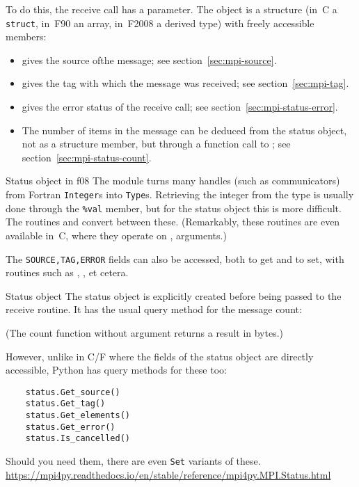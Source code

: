 To do this, the receive call has a  parameter.
The  object
is a structure (in~C a \lstinline{struct}, in~F90 an array, in~F2008 a derived type)
with freely accessible members:
\begin{itemize}
\item {} gives the source ofthe message;
  see section~\ref{sec:mpi-source}.
\item {} gives the tag with which the message was received;
  see section~\ref{sec:mpi-tag}.
\item {} gives the error status of the receive call;
  see section~\ref{sec:mpi-status-error}.
\item The number of items in the message can be deduced from the status object,
  not as a structure member,
  but through a function call to ;  
  see section~\ref{sec:mpi-status-count}.
\end{itemize}

\begin{fortrannote}{Status object in f08}
  \label{f:status-object}
  The  module turns many handles
  (such as communicators)
  from Fortran \lstinline{Integer}s into \lstinline{Type}s.
  Retrieving the integer from the type is usually done
  through the \lstinline+%val+ member,
  but for the status object this is more difficult.
  The routines  and 
  convert between these.
  (Remarkably, these routines are even available in~C,
  where they operate on ,  arguments.)
\end{fortrannote}

\begin{mpifournote}
  The \lstinline{SOURCE,TAG,ERROR} fields can also be accessed,
  both to get and to set,
  with routines such as
  ,
  ,
  et cetera.
\end{mpifournote}

\begin{pythonnote}{Status object}
  The status object is explicitly created before being passed
  to the receive routine. It has the usual query method
  for the message count:

  (The count function without argument returns a result in bytes.)

  However, unlike in C/F where the fields of the status object
  are directly accessible, Python has query methods for these too:
  \begin{lstlisting}
    status.Get_source()
    status.Get_tag()
    status.Get_elements()
    status.Get_error()
    status.Is_cancelled()
  \end{lstlisting}
  Should you need them, there are even \lstinline{Set}
  variants of these.
  \url{https://mpi4py.readthedocs.io/en/stable/reference/mpi4py.MPI.Status.html}
\end{pythonnote}

